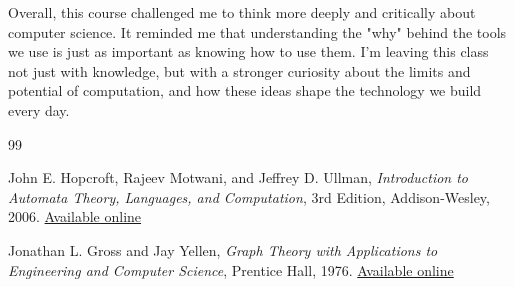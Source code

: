 \documentclass{article}
\theoremstyle{theorem}
\theoremstyle{definition}
\theoremstyle{remark}
\begin{document}
Overall, this course challenged me to think more deeply and critically about computer science. It reminded me that understanding the "why" behind the tools we use is just as important as knowing how to use them. I’m leaving this class not just with knowledge, but with a stronger curiosity about the limits and potential of computation, and how these ideas shape the technology we build every day.

\begin{thebibliography}{99}

John E. Hopcroft, Rajeev Motwani, and Jeffrey D. Ullman, 
\textit{Introduction to Automata Theory, Languages, and Computation}, 
3rd Edition, Addison-Wesley, 2006. 
\href{https://archive.org/details/hopcroft-motwani-ullman-introduction-to-automata-theory-languages-and-computations-3rd-edition/}{Available online}

Jonathan L. Gross and Jay Yellen, 
\textit{Graph Theory with Applications to Engineering and Computer Science}, 
Prentice Hall, 1976. 
\href{https://archive.org/details/GraphTheoryWithApplicationsToEngineeringAndComputerScience/}{Available online}

\end{thebibliography}
\end{document}
